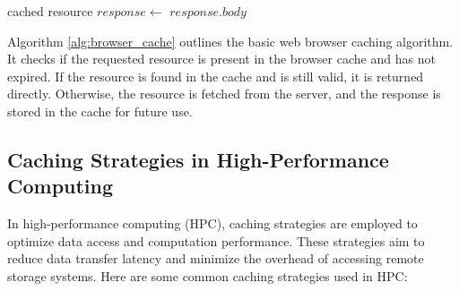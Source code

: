 \documentclass[12pt]{book} %
\begin{document}
\FloatBarrier
\begin{algorithm}[h]
\caption{Web Browser Caching Algorithm}\label{alg:browser_cache}
\begin{algorithmic}[1]
            \State \Return cached resource
        \EndIf
    \EndIf
    \State $response \gets$ 
        \State {}
    \EndIf
    \State \Return $response.body$
\EndFunction
\end{algorithmic}
\end{algorithm}
\FloatBarrier

Algorithm \ref{alg:browser_cache} outlines the basic web browser caching algorithm. It checks if the requested resource is present in the browser cache and has not expired. If the resource is found in the cache and is still valid, it is returned directly. Otherwise, the resource is fetched from the server, and the response is stored in the cache for future use.

\subsection{Caching Strategies in High-Performance Computing}
In high-performance computing (HPC), caching strategies are employed to optimize data access and computation performance. These strategies aim to reduce data transfer latency and minimize the overhead of accessing remote storage systems. Here are some common caching strategies used in HPC:
\end{document}
